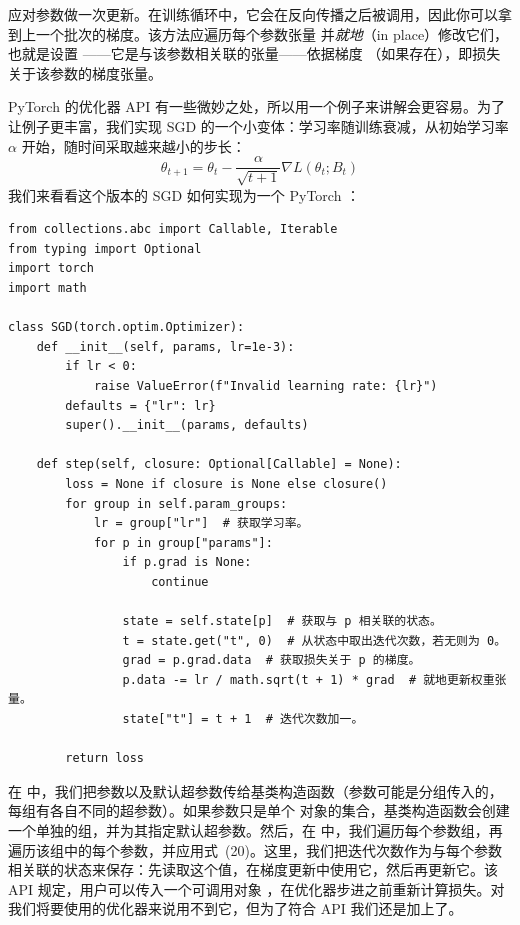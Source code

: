 \quad 应对参数做一次更新。在训练循环中，它会在反向传播之后被调用，因此你可以拿到上一个批次的梯度。该方法应遍历每个参数张量  并\textit{就地}（in place）修改它们，也就是设置 ——它是与该参数相关联的张量——依据梯度 （如果存在），即损失关于该参数的梯度张量。

PyTorch 的优化器 API 有一些微妙之处，所以用一个例子来讲解会更容易。为了让例子更丰富，我们实现 SGD 的一个小变体：学习率随训练衰减，从初始学习率 $\alpha$ 开始，随时间采取越来越小的步长：
\begin{equation}
\theta_{t+1} = \theta_t - \frac{\alpha}{\sqrt{t+1}} \nabla L(\theta_t; B_t)
\tag{20}
\end{equation}
我们来看看这个版本的 SGD 如何实现为一个 PyTorch ：

\begin{lstlisting}
from collections.abc import Callable, Iterable
from typing import Optional
import torch
import math

class SGD(torch.optim.Optimizer):
    def __init__(self, params, lr=1e-3):
        if lr < 0:
            raise ValueError(f"Invalid learning rate: {lr}")
        defaults = {"lr": lr}
        super().__init__(params, defaults)

    def step(self, closure: Optional[Callable] = None):
        loss = None if closure is None else closure()
        for group in self.param_groups:
            lr = group["lr"]  # 获取学习率。
            for p in group["params"]:
                if p.grad is None:
                    continue

                state = self.state[p]  # 获取与 p 相关联的状态。
                t = state.get("t", 0)  # 从状态中取出迭代次数，若无则为 0。
                grad = p.grad.data  # 获取损失关于 p 的梯度。
                p.data -= lr / math.sqrt(t + 1) * grad  # 就地更新权重张量。
                state["t"] = t + 1  # 迭代次数加一。

        return loss
\end{lstlisting}

在  中，我们把参数以及默认超参数传给基类构造函数（参数可能是分组传入的，每组有各自不同的超参数）。如果参数只是单个  对象的集合，基类构造函数会创建一个单独的组，并为其指定默认超参数。然后，在  中，我们遍历每个参数组，再遍历该组中的每个参数，并应用式~(20)。这里，我们把迭代次数作为与每个参数相关联的状态来保存：先读取这个值，在梯度更新中使用它，然后再更新它。该 API 规定，用户可以传入一个可调用对象 ，在优化器步进之前重新计算损失。对我们将要使用的优化器来说用不到它，但为了符合 API 我们还是加上了。

